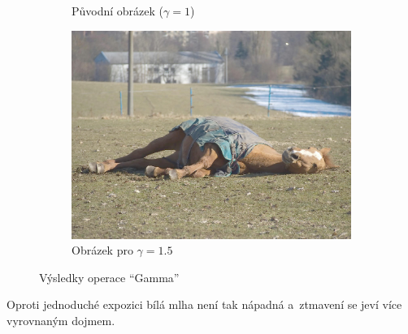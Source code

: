 \documentclass[11pt, a4paper, titlepage]{article}
\renewcommand{\uv}[1]{``#1''}
\begin{document}
\begin{figure}[h]
\begin{subfigure}[t]{0.25\textwidth}
        \caption{Původní obrázek ($\gamma = 1$)}
    \end{subfigure}
    \hspace{1cm}
    \begin{subfigure}[t]{0.25\textwidth}
        \vskip 0pt
        \includegraphics[width=1.0\textwidth]{horse_gamma_plus.jpg}
        \caption{Obrázek pro $\gamma = 1.5$}
    \end{subfigure}
    \caption{Výsledky operace \uv{Gamma}}
    \label{fig:gamma}
\end{figure}
Oproti jednoduché expozici bílá mlha není tak nápadná a~ztmavení se jeví více vyrovnaným dojmem.
\end{document}
